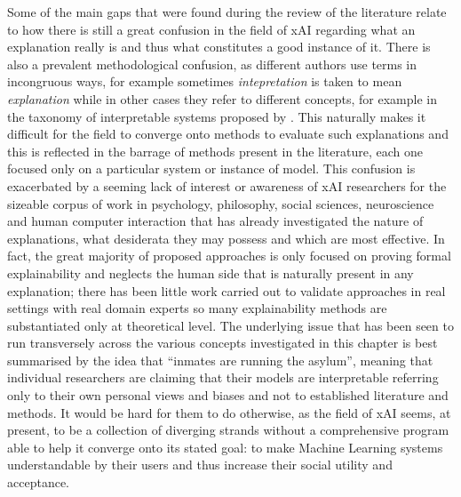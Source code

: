Some of the main gaps that were found during the review of the literature relate to how there is still a great confusion in the field of xAI regarding what an explanation really is and thus what constitutes a good instance of it.
There is also a prevalent methodological confusion, as different authors use terms in incongruous ways, for example sometimes \textit{intepretation} is taken to mean \textit{explanation} while in other cases they refer to different concepts, for example in the taxonomy of interpretable systems proposed by \citet{doshi2017towards}.
This naturally makes it difficult for the field to converge onto methods to evaluate such explanations and this is reflected in the barrage of methods present in the literature, each one focused only on a particular system or instance of model.
This confusion is exacerbated by a seeming lack of interest or awareness of xAI researchers for the sizeable corpus of work in psychology, philosophy, social sciences, neuroscience and human computer interaction that has already investigated the nature of explanations, what desiderata they may possess and which are most effective.
In fact, the great majority of proposed approaches is only focused on proving formal explainability and neglects the human side that is naturally present in any explanation; there has been little work carried out to validate approaches in real settings with real domain experts so many explainability methods are substantiated only at theoretical level.
The underlying issue that has been seen to run transversely across the various concepts investigated in this chapter is best summarised by the idea that \enquote{inmates are running the asylum}, meaning that individual researchers are claiming that their models are interpretable referring only to their own personal views and biases and not to established literature and methods.
It would be hard for them to do otherwise, as the field of xAI seems, at present, to be a collection of diverging strands without a comprehensive program able to help it converge onto its stated goal: to make Machine Learning systems understandable by their users and thus increase their social utility and acceptance.
